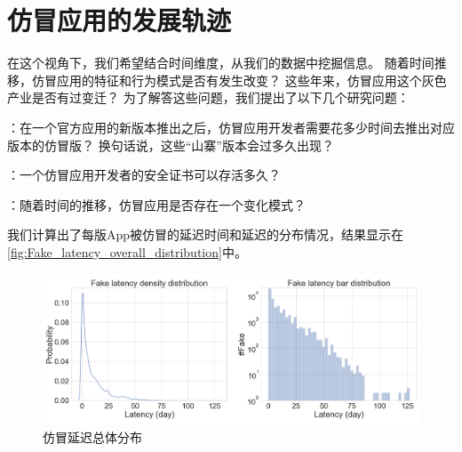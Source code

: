 \section{仿冒应用的发展轨迹}
在这个视角下，我们希望结合时间维度，从我们的数据中挖掘信息。
随着时间推移，仿冒应用的特征和行为模式是否有发生改变？
这些年来，仿冒应用这个灰色产业是否有过变迁？
为了解答这些问题，我们提出了以下几个研究问题：

\vspace{5mm}
：在一个官方应用的新版本推出之后，仿冒应用开发者需要花多少时间去推出对应版本的仿冒版？
换句话说，这些``山寨''版本会过多久出现？

：一个仿冒应用开发者的安全证书可以存活多久？

：随着时间的推移，仿冒应用是否存在一个变化模式？
\vspace{5mm}

我们计算出了每版App被仿冒的延迟时间和延迟的分布情况，结果显示在\autoref{fig:Fake_latency_overall_distribution}中。

\begin{figure}
	\centering
	\includegraphics[width=\textwidth]{./Figures/edwin-Fake_latency_overall_distribution2.png}
	\caption{仿冒延迟总体分布}
	\label{fig:Fake_latency_overall_distribution}
\end{figure}

